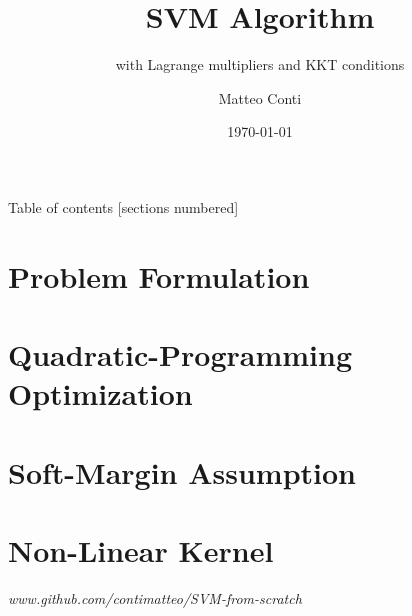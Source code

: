 \documentclass[10pt]{beamer}
\title{SVM Algorithm}
\subtitle{with Lagrange multipliers and KKT conditions}
\date{\today}
\author{Matteo Conti}
\institute{University of Bologna}
\begin{document}
\maketitle

\begin{frame}{Table of contents}
  [sections numbered]
  \tableofcontents[hideallsubsections]
\end{frame}


\section{Problem Formulation}



\section{Quadratic-Programming Optimization}



\section{Soft-Margin Assumption}



\section{Non-Linear Kernel}



\begin{frame}[standout]
  \small{\emph{www.github.com/contimatteo/SVM-from-scratch}}
\end{frame}

\end{document}
